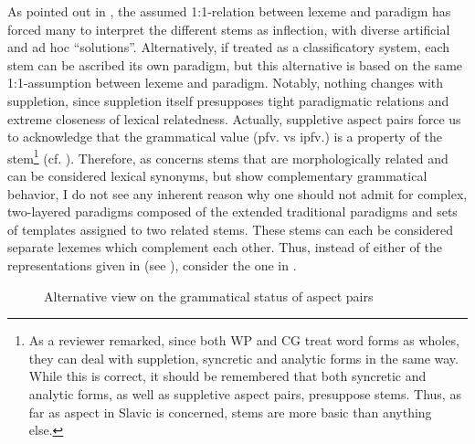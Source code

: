 \documentclass[output=paper]{langscibook}
\begin{document}
As pointed out in , the assumed 1:1-relation between lexeme and paradigm has forced many to interpret the different stems as inflection, with diverse artificial and ad hoc “solutions”. Alternatively, if treated as a classificatory system, each stem can be ascribed its own paradigm, but this alternative is based on the same 1:1-assumption between lexeme and paradigm. Notably, nothing changes with suppletion, since suppletion itself presupposes tight paradigmatic relations and extreme closeness of lexical relatedness. Actually, suppletive aspect pairs force us to acknowledge that the grammatical value (pfv. vs ipfv.) is a property of the stem\footnote{As a reviewer remarked, since both WP and CG treat word forms as wholes, they can deal with suppletion, syncretic and analytic forms in the same way. While this is correct, it should be remembered that both syncretic and analytic forms, as well as suppletive aspect pairs, presuppose stems. Thus, as far as aspect in Slavic is concerned, stems are more basic than anything else.} (cf. \citealt[149--150]{Wiemer2020b}). Therefore, as concerns stems that are morphologically related and can be considered lexical synonyms, but show complementary grammatical behavior, I do not see any inherent reason why one should not admit for complex, two-layered paradigms composed of the extended traditional paradigms and sets of templates assigned to two related stems. These stems can each be considered separate lexemes which complement each other. Thus, instead of either of the representations given in  (see ), consider the one in .

  
\begin{figure}
 \caption{Alternative view on the grammatical status of aspect pairs\label{fig:wiemer:4b}}
\end{figure}
\end{document}

